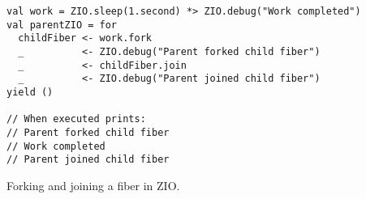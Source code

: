\begin{algorithm}

\begin{verbatim}
val work = ZIO.sleep(1.second) *> ZIO.debug("Work completed")
val parentZIO = for
  childFiber <- work.fork
  _          <- ZIO.debug("Parent forked child fiber")
  _          <- childFiber.join
  _          <- ZIO.debug("Parent joined child fiber")
yield ()

// When executed prints:
// Parent forked child fiber
// Work completed
// Parent joined child fiber
\end{verbatim}

\caption{Forking and joining a fiber in ZIO. \label{zio:forking}}
\end{algorithm}